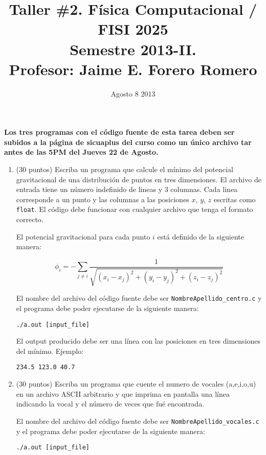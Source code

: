 \documentclass{article}
\title{Taller \#2. F\'isica Computacional / FISI 2025 \\Semestre 2013-II. \\ Profesor: Jaime E. Forero Romero}
\date{Agosto 8 2013}
\begin{document}
\maketitle

{\bf Los tres programas con el c\'odigo fuente de esta tarea deben ser subidos a la p\'agina de sicuaplus del curso como un \'unico archivo tar antes de las 5PM del Jueves 22 de Agosto.}

\begin{enumerate}


\item (30 puntos) Escriba un programa que calcule el m\'inimo del potencial gravitacional de una distribuci\'on de puntos en tres dimensiones. El archivo de entrada tiene un n\'umero indefinido de lineas y 3 columnas. Cada linea corresponde a un punto y las columnas a las posiciones $x$, $y$, $z$ escritas como \verb"float". El c\'odigo debe funcionar con cualquier archivo que tenga el formato correcto. 

El potencial gravitacional para cada punto $i$ est\'a definido de la siguiente manera:

\begin{equation}
\phi_i = -\sum_{j\neq i} \frac{1}{\sqrt{(x_i - x_j)^2 + (y_i - y_j)^2 + (z_i - z_j)^2}}
\end{equation}

El nombre del archivo del c\'odigo fuente debe ser \verb"NombreApellido_centro.c" y el programa debe poder ejecutarse de la siguiente manera:

\begin{verbatim}
./a.out [input_file]
\end{verbatim}

El output producido debe ser una l\'inea con las posiciones en tres dimensiones del m\'inimo. Ejemplo:

\begin{verbatim}
234.5 123.0 40.7
\end{verbatim}


\item (30 puntos) Escriba un programa que cuente el numero de vocales (a,e,i,o,u) en un archivo ASCII arbitrario y que imprima en pantalla una l\'inea indicando la vocal y el n\'umero de veces que fu\'e encontrada.

El nombre del archivo del c\'odigo fuente debe ser \verb"NombreApellido_vocales.c" y el programa debe poder ejecutarse de la siguiente manera:

\begin{verbatim}
./a.out [input_file]
\end{verbatim}


\end{enumerate}
\end{document}
